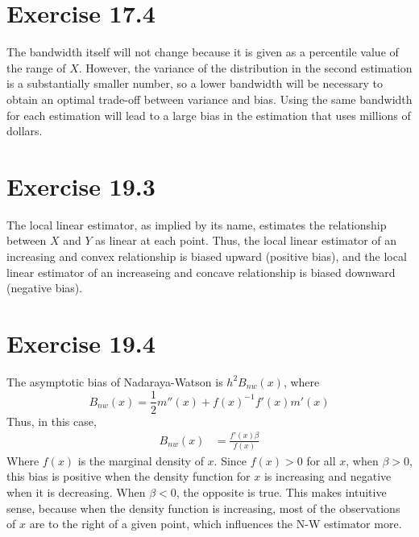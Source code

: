 \documentclass{article}
\begin{document}

\section*{Exercise 17.4}
The bandwidth itself will not change because it is given as a percentile value of the range of $X$. However, the variance of the distribution in the second estimation is a substantially smaller number, so a lower bandwidth will be necessary to obtain an optimal trade-off between variance and bias. Using the same bandwidth for each estimation will lead to a large bias in the estimation that uses millions of dollars.


\section*{Exercise 19.3}

The local linear estimator, as implied by its name, estimates the relationship between $X$ and $Y$ as linear at each point. Thus, the local linear estimator of an increasing and convex relationship is biased upward (positive bias), and the local linear estimator of an increaseing and concave relationship is biased downward (negative bias).



\section*{Exercise 19.4}
The asymptotic bias of Nadaraya-Watson is $h^2B_{nw}(x)$, where $$ B_{nw}(x) = \frac{1}{2}m''(x) + f(x)^{-1}f'(x)m'(x) $$ Thus, in this case,
\begin{align*}
	B_{nw}(x) &= \frac{f'(x)\beta}{f(x)}
\end{align*}
Where $f(x)$ is the marginal density of $x$. Since $f(x)>0$ for all $x$, when ${\beta>0}$, this bias is positive when the density function for $x$ is increasing and negative when it is decreasing. When $\beta<0$, the opposite is true. This makes intuitive sense, because when the density function is increasing, most of the observations of $x$ are to the right of a given point, which influences the N-W estimator more.

\end{document}
